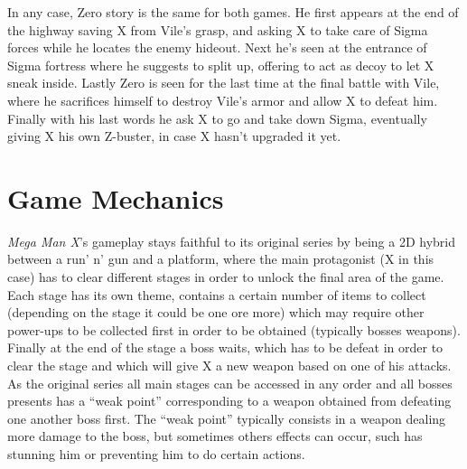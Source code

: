 In any case, Zero story is the same for both games. He first appears at the end of the highway saving X from Vile's grasp, and asking X to take care of Sigma forces while he locates the enemy hideout. Next he's seen at the entrance of Sigma fortress where he suggests to split up, offering to act as decoy to let X sneak inside. Lastly Zero is seen for the last time at the final battle with Vile, where he sacrifices himself to destroy Vile's armor and allow X to defeat him. Finally with his last words he ask X to go and take down Sigma, eventually giving X his own Z-buster, in case X hasn't upgraded it yet.

\section{Game Mechanics}
\textit{Mega Man X}'s gameplay stays faithful to its original series by being a 2D hybrid between a run' n' gun and a platform, where the main protagonist (X in this case) has to clear different stages in order to unlock the final area of the game. Each stage has its own theme, contains a certain number of items to collect (depending on the stage it could be one ore more) which may require other power-ups to be collected first in order to be obtained (typically bosses weapons). Finally at the end of the stage a boss waits, which has to be defeat in order to clear the stage and which will give X a new weapon based on one of his attacks. As the original series all main stages can be accessed in any order and all bosses presents has a ``weak point'' corresponding to a weapon obtained from defeating one another boss first. The ``weak point'' typically consists in a weapon dealing more damage to the boss, but sometimes others effects can occur, such has stunning him or preventing him to do certain actions.

